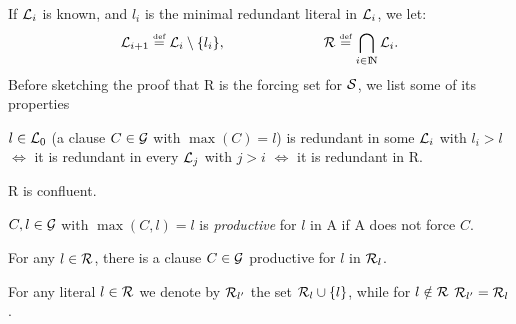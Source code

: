 If $\mbox {$\cal L$}_i$ is known, and \(l_i\) is the minimal redundant
literal in \(\mbox {$\cal L$}_i\), we let:
\begin{equation} \label{eq:atoms-model}
\mbox {$\cal L$}_{i+1} \mathrel {\stackrel {\mbox {\tiny def}}{=}} \mbox {$\cal L$}_i \setminus \{l_i\}, \hspace{7em}
\mbox {$\cal R$} \mathrel {\stackrel {\mbox {\tiny def}}{=}} \bigcap_{i\in {{\rm I\!N}}} \mbox {$\cal L$}_i.
\end{equation}
%
Before sketching the proof that \C R is the forcing set for $\mbox {$\cal S$}$, 
we list some of its properties
%
\begin{lemma} \label{le:redundancy-limit}
\(l\in\mbox {$\cal L$}_0\) (a clause \(C\in \mbox {$\cal G$}\) with \(\max(C)=l\)) is
redundant in some \(\mbox {$\cal L$}_i\) with \(l_i>l\) $\Leftrightarrow$ it is redundant in every
\(\mbox {$\cal L$}_j\) with $j>i$ $\Leftrightarrow$ it is redundant in \C R.
\end{lemma}

\begin{corollary} \label{co:model-confluent}
\C R is confluent.
\end{corollary}

\begin{definition} \label{def:productive}
\(C,l\in \mbox {$\cal G$}\) with \(\max(C,l)=l\) is {\em productive} for $l$
in \C A if \C A does not force $C$.
\end{definition}

\begin{lemma} \label{le:productive-clause}
For any \(l\in\mbox {$\cal R$}\), there is a clause \(C\in\mbox {$\cal G$}\) productive
for $l$ in \(\mbox {$\cal R$}_l\).
\end{lemma}
%
For any literal \(l\in\mbox {$\cal R$}\) we denote by \(\mbox {$\cal R$}_{l'}\) the set \(\mbox {$\cal R$}_l\cup\{l\}\), while for \(l\notin\mbox {$\cal R$}\) \(\mbox {$\cal R$}_{l'}=\mbox {$\cal R$}_l\).

